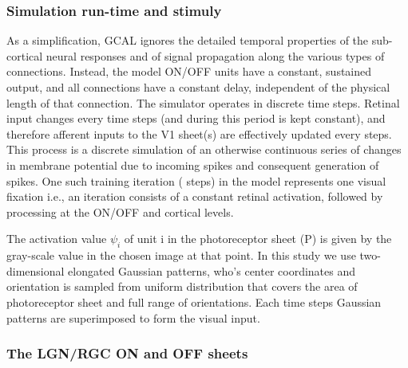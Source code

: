 \documentclass[utf8]{frontiersSCNS}
\begin{document}
\subsubsection{Simulation run-time and stimuly}

As a simplification, GCAL ignores the detailed temporal properties of the sub-cortical neural responses and of signal propagation along the various types of connections. Instead, the model ON/OFF units have a constant, sustained output, and all connections have a constant delay, independent of the physical length of that connection. The simulator operates in discrete time steps. Retinal input changes every  time steps (and during this period is kept constant), and therefore afferent inputs to the V1 sheet(s) are effectively updated every  steps. This process is a discrete simulation of an otherwise continuous series of changes in membrane potential due to incoming spikes and consequent generation of spikes. One such training iteration ( steps) in the model represents one visual fixation i.e., an iteration consists of a constant retinal activation, followed by processing at the ON/OFF and cortical levels.

The activation value $\psi_{i}$ of unit i in the photoreceptor sheet (P) is given by the gray-scale value in the chosen image at that point.
In this study we use two-dimensional elongated Gaussian patterns, who's center coordinates and orientation is sampled from uniform 
distribution that covers the area of photoreceptor sheet and full range of orientations. Each  time steps  Gaussian patterns are superimposed to form the visual input.

\subsubsection{The LGN/RGC ON and OFF sheets}
\end{document}
